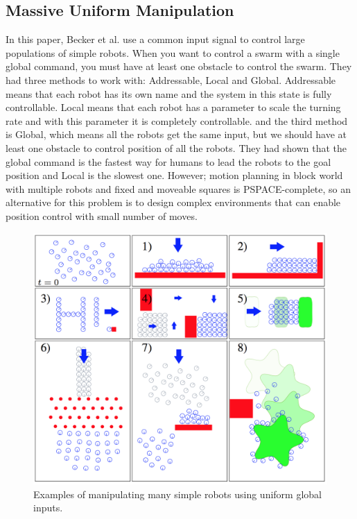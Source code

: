 \documentclass[letterpaper, 10 pt, conference]{ieeeconf}
\begin{document}
\subsection{Massive Uniform Manipulation}

In this paper, Becker et al. use a common input signal to control large populations of simple robots. \cite{AaronManipulation2013} When you want to control a swarm with a single global command, you must have at least one obstacle to control the swarm. They had three methods to work with: Addressable, Local and Global. Addressable means that each robot has its own name and the system in this state is fully controllable. Local means that each robot has a parameter to scale the turning rate and with this parameter it is completely controllable. and the third method is Global, which means all the robots get the same input, but we should have at least one obstacle to control position of all the robots. They had shown that the global command is the fastest way for humans to lead the robots to the goal position and Local is the slowest one. However; motion planning in block world with multiple robots and fixed and moveable squares is PSPACE-complete, so an alternative for this problem is to design complex environments that can enable position control with small number of moves. 
\begin{figure}[h]
\begin{center}
\includegraphics[width=\columnwidth]{massive.png}
\caption{Examples of manipulating many simple robots using uniform global inputs.\cite{AaronManipulation2013}
\label{fig:Becker}}
\end{center}
\end{figure}
\end{document}

